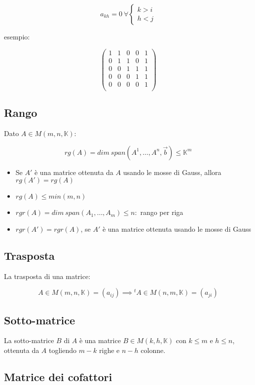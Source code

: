 \documentclass{article}
\begin{document}
$$
a_{kh} = 0\ \forall
\begin{cases}
k > i\\
h < j
\end{cases}
$$

\noindent
esempio:

$$
\begin{pmatrix}
1 & 1 & 0 & 0 & 1\\
0 & 1 & 1 & 0 & 1\\
0 & 0 & 1 & 1 & 1\\
0 & 0 & 0 & 1 & 1\\
0 & 0 & 0 & 0 & 1\\
\end{pmatrix}
$$

\subsection{Rango}

Dato $A \in M(m,n,\mathbb{K})$:

$$
rg(A)= dim\ span(A^1, \dots, A^n, \vec{b}) \leq \mathbb{K}^m
$$

\begin{itemize}
    \item Se $A'$ è una matrice ottenuta da $A$ usando le mosse di Gauss, allora $rg(A') = rg(A)$
    \item $rg(A) \leq min(m,n)$
    \item $rgr(A) = dim\ span(A_1, \dots, A_m) \leq n :$ rango per riga
    \item $rgr(A') = rgr(A)$, se $A'$ è una matrice ottenuta usando le mosse di Gauss
\end{itemize}

\subsection{Trasposta}

La trasposta di una matrice:

$$
A \in M(m,n,\mathbb{K}) = (a_{ij}) \implies {}^tA \in M(n,m,\mathbb{K}) = (a_{ji})
$$

\subsection{Sotto-matrice}

La sotto-matrice $B$ di $A$ è una matrice $B \in M(k,h,\mathbb{K})$ con $k \leq m$ e $h \leq n$, ottenuta da $A$ togliendo $m - k$ righe e $n - h$ colonne.

\subsection{Matrice dei cofattori}
\end{document}
